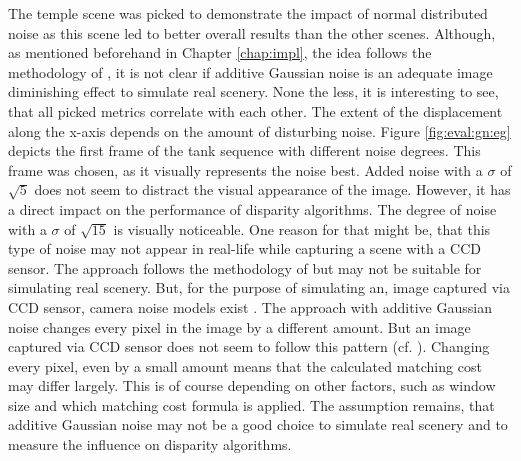 \noindent The temple scene was picked to demonstrate the impact of normal distributed noise as this scene led to better overall results than the other scenes.
Although, as mentioned beforehand in Chapter \ref{chap:impl}, the idea follows the methodology of \citeauthor{richardt2010real} \citep{richardt2010real}, it is not clear if additive Gaussian noise is an adequate image diminishing effect to simulate real scenery.
None the less, it is interesting to see, that all picked metrics correlate with each other.
The extent of the displacement along the x-axis depends on the amount of disturbing noise.
Figure \ref{fig:eval:gn:eg} depicts the first frame of the tank sequence with different noise degrees.
This frame was chosen, as it visually represents the noise best.
Added noise with a $\sigma$ of $\sqrt{5}$ does not seem to distract the visual appearance of the image.
However, it has a direct impact on the performance of disparity algorithms.
The degree of noise with a $\sigma$ of $\sqrt{15}$ is visually noticeable.
One reason for that might be, that this type of noise may not appear in real-life while capturing a scene with a CCD sensor.
The approach follows the methodology of \citeauthor{richardt2010real} \citep{richardt2010real} but may not be suitable for simulating real scenery.
But, for the purpose of simulating an, image captured via CCD sensor, camera noise models exist \citep{liu2006noise}.
The approach with additive Gaussian noise changes every pixel in the image by a different amount.
But an image captured via CCD sensor does not seem to follow this pattern (cf. \citep{liu2006noise}).
Changing every pixel, even by a small amount means that the calculated matching cost may differ largely.
This is of course depending on other factors, such as window size and which matching cost formula is applied.
The assumption remains, that additive Gaussian noise may not be a good choice to simulate real scenery and to measure the influence on disparity algorithms.

